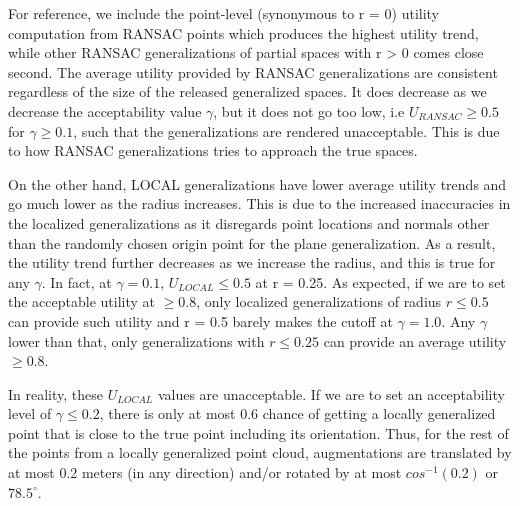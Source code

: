 For reference, we include the point-level (synonymous to r = 0) utility computation from RANSAC points which produces the highest utility trend, while other RANSAC generalizations of partial spaces with r > 0 comes close second. The average utility provided by RANSAC generalizations are consistent regardless of the size of the released generalized spaces. It does decrease as we decrease the acceptability value $\gamma$, but it does not go too low, i.e $U_{RANSAC} \geq 0.5$ for $\gamma \geq 0.1$, such that the generalizations are rendered unacceptable. This is due to how RANSAC generalizations tries to approach the true spaces.

On the other hand, LOCAL generalizations have lower average utility trends and go much lower as the radius increases. This is due to the increased inaccuracies in the localized generalizations as it disregards point locations and normals other than the randomly chosen origin point for the plane generalization. As a result, the utility trend further decreases as we increase the radius, and this is true for any $\gamma$. In fact, at $\gamma = 0.1$, $U_{LOCAL}\le 0.5$ at r = 0.25. As expected, if we are to set the acceptable utility at $\geq 0.8$, only localized generalizations of radius $r \leq 0.5$ can provide such utility and r = 0.5 barely makes the cutoff at $\gamma = 1.0$. Any $\gamma$ lower than that, only generalizations with $r \leq 0.25$ can provide an average utility $\geq 0.8$.

In reality, these $U_{LOCAL}$ values are unacceptable. If we are to set an acceptability level of $\gamma \leq 0.2$, there is only at most 0.6 chance of getting a locally generalized point that is close to the true point including its orientation. Thus, for the rest of the points from a locally generalized point cloud, augmentations are translated by at most 0.2 meters (in any direction) and/or rotated by at most $cos^{-1}(0.2)$ or $78.5^\circ$.


